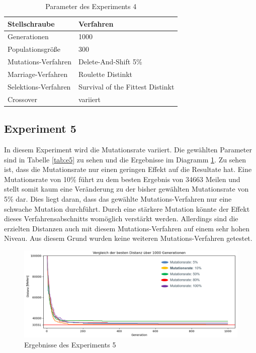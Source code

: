 \begin{table}[H]
\centering
\caption{Parameter des Experiments 4}
\begin{tabular}{ll}
Stellschraube & Verfahren \\
\hline
Generationen & 1000 \\
Populationsgröße & 300 \\
Mutations-Verfahren & Delete-And-Shift 5\% \\
Marriage-Verfahren & Roulette Distinkt \\
Selektions-Verfahren & Survival of the Fittest Distinkt \\
Crossover & variiert
\end{tabular}
\label{tab:e4}
\end{table}

\subsection{Experiment 5}
In diesem Experiment wird die Mutationsrate variiert. Die gewählten Parameter sind in Tabelle \ref{tab:e5} zu sehen und die Ergebnisse im Diagramm \ref{fig:experiment5}. Zu sehen ist, dass die Mutationsrate nur einen geringen Effekt auf die Resultate hat. 
Eine Mutationsrate von 10\% führt zu dem besten Ergebnis von 34663 Meilen und stellt somit kaum eine Veränderung zu der bisher gewählten Mutationsrate von 5\% dar. Dies liegt daran, dass das gewählte Mutations-Verfahren nur eine schwache Mutation durchführt. Durch eine stärkere Mutation könnte der Effekt dieses Verfahrensabschnitts womöglich verstärkt werden. Allerdings sind die erzielten Distanzen auch mit diesem Mutations-Verfahren auf einem sehr hohen Niveau. Aus diesem Grund wurden keine weiteren Mutations-Verfahren getestet.

\begin{figure}[H]
\centering
\includegraphics[width=1\textwidth]{img/Vortrag/experiment5.png}
\caption{Ergebnisse des Experiments 5}
\label{fig:experiment5}
\end{figure}

